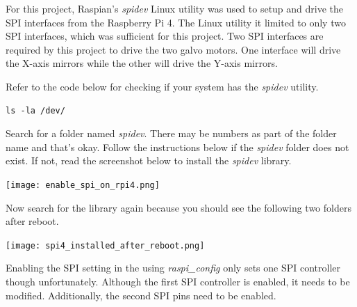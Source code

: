 \documentclass[journal]{IEEEtran}
\begin{document}
    For this project, Raspian's \emph{spidev} Linux utility was used to setup and drive the SPI interfaces from the Raspberry Pi 4. 
    The Linux utility it limited to only two SPI interfaces, which was sufficient for this project.
    Two SPI interfaces are required by this project to drive the two galvo motors.
    One interface will drive the X-axis mirrors while the other will drive the Y-axis mirrors.
    
    Refer to the code below for checking if your system has the \emph{spidev} utility.

    \begin{lstlisting}[frame=single, basicstyle=\ttfamily\footnotesize, breaklines=true]
        ls -la /dev/
    \end{lstlisting}

    Search for a folder named \emph{spidev}.
    There may be numbers as part of the folder name and that's okay.
    Follow the instructions below if the \emph{spidev} folder does not exist.
    If not, read the screenshot below to install the \emph{spidev} library.

    \texttt{[image: enable\_spi\_on\_rpi4.png]}

    Now search for the library again because you should see the following two folders after reboot.

    \texttt{[image: spi4\_installed\_after\_reboot.png]}

    Enabling the SPI setting in the using \emph{raspi\_config} only sets one SPI controller though unfortunately. 
    Although the first SPI controller is enabled, it needs to be modified.
    Additionally, the second SPI pins need to be enabled.
    
\end{document}
